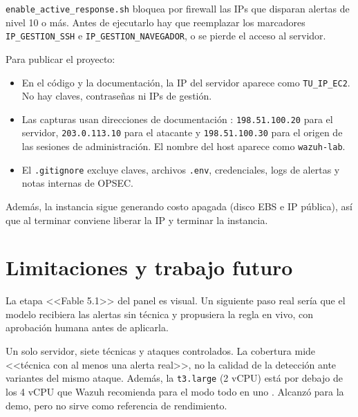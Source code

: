 \documentclass{mapc-proyecto}
\begin{document}
\begin{riesgo}
\texttt{enable\_active\_response.sh} bloquea por firewall las IPs que disparan
alertas de nivel 10 o más. Antes de ejecutarlo hay que reemplazar los marcadores
\texttt{IP\_GESTION\_SSH} e \texttt{IP\_GESTION\_NAVEGADOR}, o se pierde el acceso
al servidor.
\end{riesgo}

Para publicar el proyecto:

\begin{itemize}
  \item En el código y la documentación, la IP del servidor aparece como
        \texttt{TU\_IP\_EC2}. No hay claves, contraseñas ni IPs de gestión.
  \item Las capturas usan direcciones de documentación \parencite{rfc5737}:
        \texttt{198.51.100.20} para el servidor, \texttt{203.0.113.10} para el
        atacante y \texttt{198.51.100.30} para el origen de las sesiones de
        administración. El nombre del host aparece como \texttt{wazuh-lab}.
  \item El \texttt{.gitignore} excluye claves, archivos \texttt{.env},
        credenciales, logs de alertas y notas internas de OPSEC.
\end{itemize}

Además, la instancia sigue generando costo apagada (disco EBS e IP pública), así
que al terminar conviene liberar la IP y terminar la instancia.

\section{Limitaciones y trabajo futuro}

\begin{limitacion}
La etapa <<Fable 5.1>> del panel es visual. Un siguiente paso real sería que el
modelo recibiera las alertas sin técnica y propusiera la regla en vivo, con
aprobación humana antes de aplicarla.
\end{limitacion}

\begin{limitacion}
Un solo servidor, siete técnicas y ataques controlados. La cobertura mide
<<técnica con al menos una alerta real>>, no la calidad de la detección ante
variantes del mismo ataque. Además, la \texttt{t3.large} (2 vCPU) está por debajo
de los 4 vCPU que Wazuh recomienda para el modo todo en uno
\parencite{wazuh-quickstart}. Alcanzó para la demo, pero no sirve como referencia
de rendimiento.
\end{limitacion}
\end{document}
